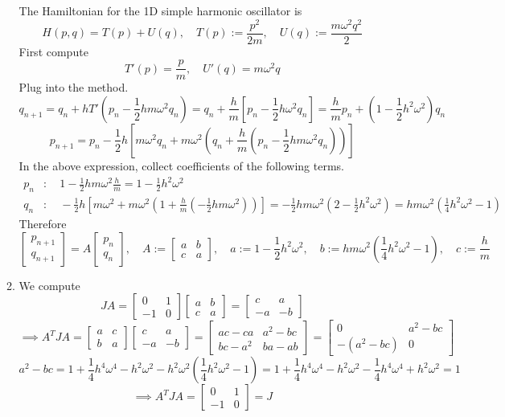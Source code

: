 \documentclass{article}
\newcommand{\br}[1]{\left(#1\right)}
\newcommand{\sbr}[1]{\left[#1\right]}
\newcommand{\m}[2][b]{\begin{#1matrix}#2\end{#1matrix}}
\newcommand{\imp}{\implies}
\newcommand{\om}{\omega}
\begin{document}
\begin{enumerate}
\begin{enumerate}
	The Hamiltonian for the 1D simple harmonic oscillator is
	$$H(p,q) = T(p) + U(q),
	\quad T(p) := \frac{p^2}{2m},
	\quad U(q) := \frac{m\om^2q^2}{2}$$
	First compute
	$$T'(p) = \frac pm,
	\quad U'(q) = m\om^2q$$
	Plug into the method.
	$$q_{n+1} = q_n + hT'\br{p_n - \frac12hm\om^2q_n}
	= q_n + \frac hm\sbr{p_n - \frac12h\om^2q_n}
	= \frac hmp_n + \br{1 - \frac12h^2\om^2}q_n$$
	$$p_{n+1} = p_n - \frac12h\sbr{m\om^2q_n + m\om^2\br{q_n + \frac hm\br{p_n - \frac12hm\om^2q_n}}}$$
	In the above expression, collect coefficients of the following terms.
	\begin{align*}
		p_n &: \quad 1 - \frac12hm\om^2\frac hm = 1 - \frac12h^2\om^2 \\
		q_n &: \quad -\frac12h\sbr{m\om^2 + m\om^2\br{1+ \frac hm\br{-\frac12hm\om^2}}}
		= -\frac12hm\om^2\br{2 - \frac12h^2\om^2}
		= hm\om^2\br{\frac14h^2\om^2 - 1}
	\end{align*}
	Therefore
	$$\m{p_{n+1} \\ q_{n+1}} = A\m{p_n \\ q_n},
	\quad A := \m{a & b \\ c & a},
	\quad a := 1 - \frac12h^2\om^2,
	\quad b := hm\om^2\br{\frac14h^2\om^2 - 1},
	\quad c := \frac hm$$
	
	
	\item We compute
	$$JA = \m{0 & 1 \\ -1 & 0}\m{a & b \\ c & a}
	= \m{c & a \\ -a & -b}$$
	$$\imp A^TJA = \m{a & c \\ b & a}\m{c & a \\ -a & -b}
	= \m{ac-ca & a^2-bc \\ bc-a^2 & ba-ab}
	= \m{0 & a^2-bc \\ -(a^2-bc) & 0}$$
	$$a^2 - bc = 1 + \frac14h^4\om^4 - h^2\om^2 - h^2\om^2\br{\frac14h^2\om^2 - 1}
	= 1 + \frac14h^4\om^4 - h^2\om^2 - \frac14h^4\om^4 + h^2\om^2
	= 1$$
	$$\imp A^TJA = \m{0 & 1 \\ -1 & 0} = J$$
	

\end{enumerate}
\end{enumerate}
\end{document}
